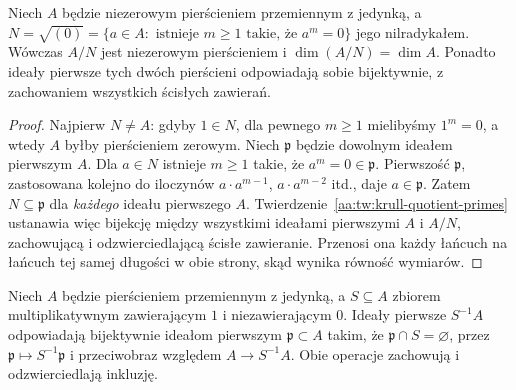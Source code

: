 \begin{wniosek}\label{aa:cor:krull-nilradical}
Niech $A$ będzie niezerowym pierścieniem przemiennym z jedynką,
a $N=\sqrt{(0)}=\{a\in A:\text{ istnieje }m\ge1\text{ takie, że }a^m=0\}$
jego nilradykałem. Wówczas $A/N$ jest niezerowym pierścieniem
i $\dim(A/N)=\dim A$. Ponadto ideały pierwsze tych dwóch
pierścieni odpowiadają sobie bijektywnie, z zachowaniem wszystkich
ścisłych zawierań.
\end{wniosek}
\begin{proof}
Najpierw $N\ne A$: gdyby $1\in N$, dla pewnego $m\ge1$
mielibyśmy $1^m=0$, a wtedy $A$ byłby pierścieniem zerowym.
Niech $\mathfrak p$ będzie dowolnym ideałem pierwszym $A$.
Dla $a\in N$ istnieje $m\ge1$ takie, że $a^m=0\in\mathfrak p$.
Pierwszość $\mathfrak p$, zastosowana kolejno do iloczynów
$a\cdot a^{m-1}$, $a\cdot a^{m-2}$ itd., daje $a\in\mathfrak p$.
Zatem $N\subseteq\mathfrak p$ dla \emph{każdego} ideału
pierwszego $A$. Twierdzenie~\ref{aa:tw:krull-quotient-primes}
ustanawia więc bijekcję między wszystkimi ideałami pierwszymi
$A$ i $A/N$, zachowującą i odzwierciedlającą ścisłe zawieranie.
Przenosi ona każdy łańcuch na łańcuch tej samej długości
w obie strony, skąd wynika równość wymiarów.
\end{proof}
\begin{twierdzenie}\label{aa:tw:krull-localization-primes}
Niech $A$ będzie pierścieniem przemiennym z jedynką,
a $S\subseteq A$ zbiorem multiplikatywnym zawierającym $1$
i niezawierającym $0$. Ideały pierwsze $S^{-1}A$ odpowiadają
bijektywnie ideałom pierwszym $\mathfrak p\subset A$ takim,
że $\mathfrak p\cap S=\varnothing$, przez
$\mathfrak p\mapsto S^{-1}\mathfrak p$ i przeciwobraz względem
$A\to S^{-1}A$. Obie operacje zachowują i odzwierciedlają inkluzję.
\end{twierdzenie}
